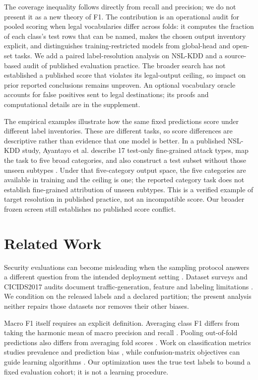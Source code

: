 \documentclass[namedate,webpdf,contemporary,large]{TBench-template}
\begin{document}
The coverage inequality follows directly from recall and precision; we do not present it as a new theory of F1. The contribution is an operational audit for pooled scoring when legal vocabularies differ across folds: it computes the fraction of each class's test rows that can be named, makes the chosen output inventory explicit, and distinguishes training-restricted models from global-head and open-set tasks. We add a paired label-resolution analysis on NSL-KDD and a source-based audit of published evaluation practice. The broader search has not established a published score that violates its legal-output ceiling, so impact on prior reported conclusions remains unproven. An optional vocabulary oracle accounts for false positives sent to legal destinations; its proofs and computational details are in the supplement.

The empirical examples illustrate how the same fixed predictions score under different label inventories. These are different tasks, so score differences are descriptive rather than evidence that one model is better. In a published NSL-KDD study, Ayantayo et al. describe 17 test-only fine-grained attack types, map the task to five broad categories, and also construct a test subset without those unseen subtypes \cite{ayantayo2023}. Under that five-category output space, the five categories are available in training and the ceiling is one; the reported category task does not establish fine-grained attribution of unseen subtypes. This is a verified example of target resolution in published practice, not an incompatible score. Our broader frozen screen still establishes no published score conflict.

\section{Related Work}
Security evaluations can become misleading when the sampling protocol answers a different question from the intended deployment setting \cite{sommer2010,arp2022}. Dataset surveys and CICIDS2017 audits document traffic-generation, feature and labeling limitations \cite{ring2019,engelen2021,lanvin2023}. We condition on the released labels and a declared partition; the present analysis neither repairs those datasets nor removes their other biases.

Macro F1 itself requires an explicit definition. Averaging class F1 differs from taking the harmonic mean of macro precision and recall \cite{opitzburst2019}. Pooling out-of-fold predictions also differs from averaging fold scores \cite{forman2010}. Work on classification metrics studies prevalence and prediction bias \cite{opitz2024,sokolova2009}, while confusion-matrix objectives can guide learning algorithms \cite{narasimhan2015}. Our optimization uses the true test labels to bound a fixed evaluation cohort; it is not a learning procedure.
\end{document}
